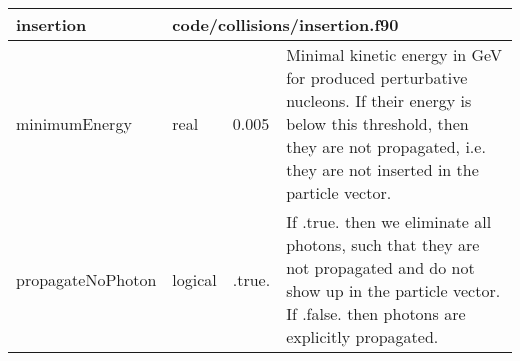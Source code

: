 \documentclass{article}
\begin{document}
\begin{longtable}{llll}
\toprule
\textbf{\large{insertion}} & \multicolumn{3}{l}{\footnotesize{code/collisions/insertion.f90}}\\*
\midrule
\endfirsthead
\midrule
\endhead
minimumEnergy & \begin{minipage}[t]{2cm}real\end{minipage} & \begin{minipage}[t]{2cm}0.005\end{minipage} & \begin{minipage}[t]{12cm}Minimal kinetic energy in GeV for produced perturbative nucleons. If their energy is below this threshold, then they are not propagated, i.e. they are not inserted in the particle vector.\end{minipage}\\*
\midrule
propagateNoPhoton & \begin{minipage}[t]{2cm}logical\end{minipage} & \begin{minipage}[t]{2cm}.true.\end{minipage} & \begin{minipage}[t]{12cm}If .true. then we eliminate all photons, such that they are not propagated and do not show up in the particle vector. If .false. then photons are explicitly propagated.\end{minipage}\\*
\bottomrule
\end{longtable}
{ }



\end{document}
